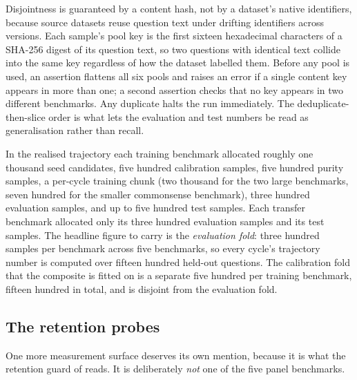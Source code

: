 \begin{fromcode}
Disjointness is guaranteed by a content hash, not by a dataset's native identifiers,
because source datasets reuse question text under drifting identifiers across
versions. Each sample's pool key is the first sixteen hexadecimal characters of a
SHA-256 digest of its question text, so two questions with identical text collide
into the same key regardless of how the dataset labelled them. Before any pool is
used, an assertion flattens all six pools and raises an error if a single content key
appears in more than one; a second assertion checks that no key appears in two
different benchmarks. Any duplicate halts the run immediately. The
deduplicate-then-slice order is what lets the evaluation and test numbers be read as
generalisation rather than recall.
\end{fromcode}

\begin{bythenumbers}
In the realised trajectory each training benchmark allocated roughly one thousand
seed candidates, five hundred calibration samples, five hundred purity samples, a
per-cycle training chunk (two thousand for the two large benchmarks, seven hundred
for the smaller commonsense benchmark), three hundred evaluation samples, and up to
five hundred test samples. Each transfer benchmark allocated only its three hundred
evaluation samples and its test samples. The headline figure to carry is the
\emph{evaluation fold}: three hundred samples per benchmark across five benchmarks,
so every cycle's trajectory number is computed over fifteen hundred held-out
questions. The calibration fold that the composite is fitted on is a separate five
hundred per training benchmark, fifteen hundred in total, and is disjoint from the
evaluation fold.
\end{bythenumbers}

\subsection*{The retention probes}

One more measurement surface deserves its own mention, because it is what the
retention guard of  reads. It is deliberately \emph{not} one of the
five panel benchmarks.

